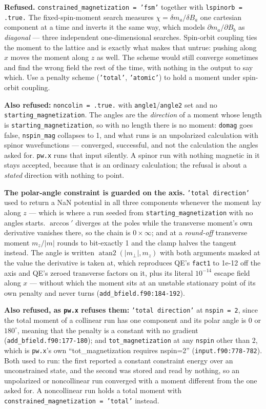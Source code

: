 \documentclass[11pt,a4paper]{article}
\newcommand{\code}[1]{\texttt{\small #1}}
\begin{document}
\begin{refuses}
\textbf{Refused.} \code{constrained\_magnetization = 'fsm'} together with
\code{lspinorb = .true.} The fixed-spin-moment search measures $\chi = \delta
m_a / \delta B_a$ one cartesian component at a time and inverts it the same
way, which models $\partial m_a/\partial B_b$ as \emph{diagonal} --- three
independent one-dimensional searches. Spin-orbit coupling ties the moment to the
lattice and is exactly what makes that untrue: pushing along $x$ moves the moment
along $z$ as well. The scheme would still converge sometimes and find the wrong
field the rest of the time, with nothing in the output to say which. Use a
penalty scheme (\code{'total'}, \code{'atomic'}) to hold a moment under
spin-orbit coupling.

\textbf{Also refused:} \code{noncolin = .true.} with \code{angle1}/\code{angle2}
set and no \code{starting\_magnetization}. The angles are the \emph{direction}
of a moment whose length is \code{starting\_magnetization}, so with no length
there is no moment: \code{domag} goes false, \code{nspin\_mag} collapses to 1,
and what runs is an unpolarized calculation with spinor wavefunctions ---
converged, successful, and not the calculation the angles asked for. \code{pw.x}
runs that input silently. A spinor run with nothing magnetic in it stays
accepted, because that is an ordinary calculation; the refusal is about a
\emph{stated} direction with nothing to point.

\textbf{The polar-angle constraint is guarded on the axis.}
\code{'total direction'} used to return a NaN potential in all three components
whenever the moment lay along $z$ --- which is where a run seeded from
\code{starting\_magnetization} with no angles starts. $\arccos'$ diverges at the
poles while the transverse moment's own derivative vanishes there, so the chain
is $0 \times \infty$; and at a \emph{round-off} transverse moment $m_z/|m|$
rounds to bit-exactly 1 and the clamp halves the tangent instead. The angle is
written $\operatorname{atan2}(|m_\perp|, m_z)$ with both arguments masked at the
value the derivative is taken at, which reproduces QE's \code{fact1} to 1e-12
off the axis and QE's zeroed transverse factors on it, plus its literal
$10^{-14}$ escape field along $x$ --- without which the moment sits at an
unstable stationary point of its own penalty and never turns
(\code{add\_bfield.f90:184-192}).

\textbf{Also refused, as \code{pw.x} refuses them:} \code{'total direction'}
at \code{nspin = 2}, since the total moment of a collinear run has one component
and its polar angle is $0$ or $180^\circ$, meaning that the penalty is a
constant with no gradient (\code{add\_bfield.f90:177-180}); and
\code{tot\_magnetization} at any \code{nspin} other than 2, which is
\code{pw.x}'s own ``tot\_magnetization requires nspin=2''
(\code{input.f90:778-782}). Both used to run: the first reported a constant
constraint energy over an unconstrained state, and the second was stored and
read by nothing, so an unpolarized or noncollinear run converged with a moment
different from the one asked for. A noncollinear run holds a total moment with
\code{constrained\_magnetization = 'total'} instead.
\end{refuses}
\end{document}
